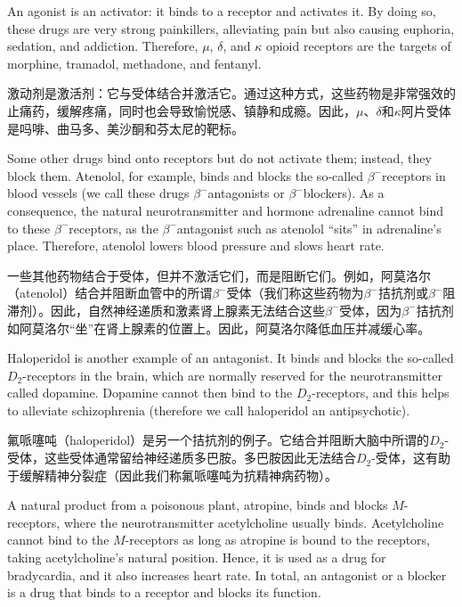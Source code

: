 \documentclass[dvipsnames, svgnames,a4paper,11pt]{article}
\begin{document}
An agonist is an activator: it binds to a receptor and activates it. By doing so, these drugs are very strong painkillers, alleviating pain but also causing euphoria, sedation, and addiction. Therefore, $\mu$, $\delta$, and $\kappa$ opioid receptors are the targets of morphine, tramadol, methadone, and fentanyl.

激动剂是激活剂：它与受体结合并激活它。通过这种方式，这些药物是非常强效的止痛药，缓解疼痛，同时也会导致愉悦感、镇静和成瘾。因此，$\mu$、$\delta$和$\kappa$阿片受体是吗啡、曲马多、美沙酮和芬太尼的靶标。


Some other drugs bind onto receptors but do not activate them; instead, they block them. Atenolol, for example, binds and blocks the so-called $\beta^{-}$receptors in blood vessels (we call these drugs $\beta^{-}$antagonists or $\beta^{-}$blockers). As a consequence, the natural neurotransmitter and hormone adrenaline cannot bind to these $\beta^{-}$receptors, as the $\beta^{-}$antagonist such as atenolol “sits” in adrenaline’s place. Therefore, atenolol lowers blood pressure and slows heart rate.

一些其他药物结合于受体，但并不激活它们，而是阻断它们。例如，阿莫洛尔（atenolol）结合并阻断血管中的所谓$\beta^{-}$受体（我们称这些药物为$\beta^{-}$拮抗剂或$\beta^{-}$阻滞剂）。因此，自然神经递质和激素肾上腺素无法结合这些$\beta^{-}$受体，因为$\beta^{-}$拮抗剂如阿莫洛尔“坐”在肾上腺素的位置上。因此，阿莫洛尔降低血压并减缓心率。

Haloperidol is another example of an antagonist. It binds and blocks the so-called $D_2$-receptors in the brain, which are normally reserved for the neurotransmitter called dopamine. Dopamine cannot then bind to the $D_2$-receptors, and this helps to alleviate schizophrenia (therefore we call haloperidol an antipsychotic).

氟哌噻吨（haloperidol）是另一个拮抗剂的例子。它结合并阻断大脑中所谓的$D_2$-受体，这些受体通常留给神经递质多巴胺。多巴胺因此无法结合$D_2$-受体，这有助于缓解精神分裂症（因此我们称氟哌噻吨为抗精神病药物）。

A natural product from a poisonous plant, atropine, binds and blocks $M$-receptors, where the neurotransmitter acetylcholine usually binds. Acetylcholine cannot bind to the $M$-receptors as long as atropine is bound to the receptors, taking acetylcholine’s natural position. Hence, it is used as a drug for bradycardia, and it also increases heart rate. In total, an antagonist or a blocker is a drug that binds to a receptor and blocks its function.
\end{document}
